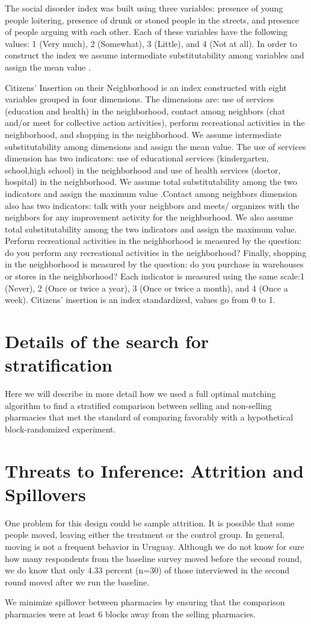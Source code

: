 \documentclass[11pt]{article}
\begin{document}
\newpage The social disorder index was built using three variables: presence of young people loitering, presence of drunk or stoned people in the streets, and presence of people arguing with each other. Each of these variables have the following values: 1 (Very much), 2 (Somewhat), 3 (Little), and 4 (Not at all). In order to construct the index we assume intermediate substitutability among variables and assign the mean value \citep{goertz2006social}.

Citizens' Insertion on their Neighborhood is an index constructed with eight variables grouped in four dimensions. The dimensions are: use of services (education and health) in the neighborhood, contact among neighbors (chat and/or meet for collective action activities), perform recreational activities in the neighborhood, and shopping in the neighborhood. We assume intermediate substitutability among dimensions and assign the mean value. The use of services dimension has two indicators: use of educational services (kindergarten, school,high school) in the neighborhood and use of health services (doctor, hospital) in the neighborhood. We assume total substitutability among the two indicators and assign the maximum value  \citep{goertz2006social}.Contact among neighbors dimension also has two indicators: talk with your neighbors and meets/ organizes with the neighbors for any improvement activity for the neighborhood. We also assume total substitutability among the two indicators and assign the maximum value. Perform recreational activities in the neighborhood is measured by the question: do you perform any recreational activities in the neighborhood? Finally, shopping in the neighborhood is measured by the question: do you purchase in warehouses or stores in the neighborhood? Each indicator is measured using the same scale:1 (Never), 2 (Once or twice a year), 3 (Once or twice a month), and 4 (Once a week).  Citizens' insertion is an index standardized, values go from 0 to 1.

\section{Details of the search for stratification}
Here we will describe in more detail how we used a full optimal matching algorithm \citep{hansen:2004} to find a stratified comparison between selling and non-selling pharmacies that met the standard of comparing favorably with a hypothetical block-randomized experiment.

\section{Threats to Inference: Attrition and Spillovers}
One problem for this design could be sample attrition. It is possible that some people moved, leaving either the treatment or the control group. In general, moving is not a frequent behavior in Uruguay. Although we do not know for sure how many respondents from the baseline survey moved before the second round, we do know that only 4.33 percent (n=30) of those interviewed in the second round moved after we run the baseline.

We minimize spillover between pharmacies by ensuring that the comparison pharmacies were at least 6 blocks away from the selling pharmacies.
\end{document}
